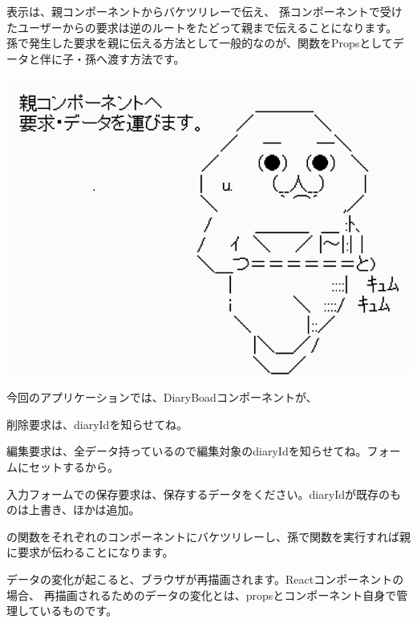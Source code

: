 \vspace*{\baselineskip}

表示は、親コンポーネントからバケツリレーで伝え、
孫コンポーネントで受けたユーザーからの要求は逆のルートをたどって親まで伝えることになります。
孫で発生した要求を親に伝える方法として一般的なのが、関数をPropsとしてデータと伴に子・孫へ渡す方法です。

\begin{reviewimage}[H]%
\includegraphics[width=0.6\maxwidth]{./images/03-todo-with-react/propsDrilling.png}%
\label{image:03-todo-with-react:propsDrilling}
\end{reviewimage}
\vspace*{\baselineskip}

今回のアプリケーションでは、DiaryBoadコンポーネントが、

\begin{starteritemize}
\item 削除要求は、diaryIdを知らせてね。
\item 編集要求は、全データ持っているので編集対象のdiaryIdを知らせてね。フォームにセットするから。
\item 入力フォームでの保存要求は、保存するデータをください。diaryIdが既存のものは上書き、ほかは追加。
\end{starteritemize}

の関数をそれぞれのコンポーネントにバケツリレーし、孫で関数を実行すれば親に要求が伝わることになります。

\vspace*{\baselineskip}

データの変化が起こると、ブラウザが再描画されます。Reactコンポーネントの場合、
再描画されるためのデータの変化とは、propsとコンポーネント自身で管理しているものです。

